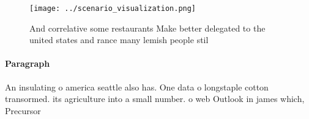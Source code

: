 \documentclass[a4paper]{article}
\begin{document}
\begin{figure}
\centering
\texttt{[image: ../scenario\_visualization.png]}
\caption{And correlative some restaurants Make better delegated to the united states and rance many lemish people stil
}
\end{figure}
 
\paragraph{Paragraph}
An insulating o america seattle also has. One data o longstaple cotton transormed. its agriculture into a small number. o web Outlook in james which, Precursor
\end{document}
